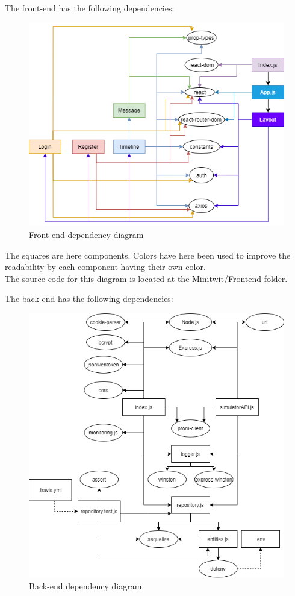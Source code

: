 The front-end has the following dependencies:
\begin{figure}[H]
    \centering
    \includegraphics[width=0.9\linewidth]{report/images/Frontend-dependencies.png}
    \caption{Front-end dependency diagram}
    \label{fig:front-end-depencency-diagram}
\end{figure}
The squares are here components. Colors have here been used to improve the readability by each component having their own color. \\
The source code for this diagram is located at the Minitwit/Frontend folder.

\newpage
The back-end has the following dependencies:
\begin{figure}[H]
    \centering
    \includegraphics[width=1\linewidth]{report/images/backend-dependencies.png}
    \caption{Back-end dependency diagram}
    \label{fig:back-end-depencency-diagram}
\end{figure}

